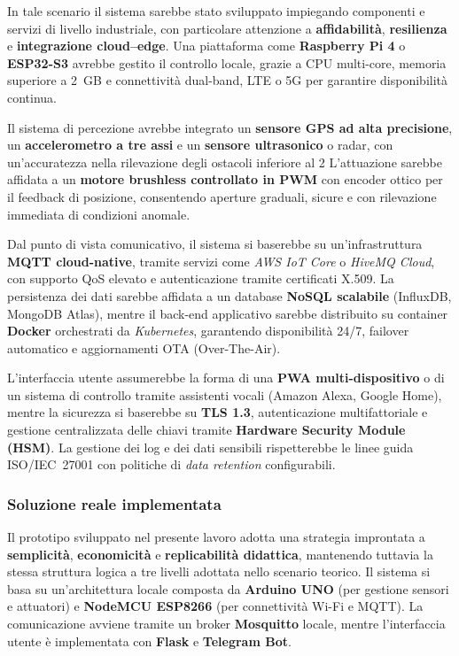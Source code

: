 In tale scenario il sistema sarebbe stato sviluppato impiegando componenti e servizi di livello industriale, con particolare attenzione a \textbf{affidabilità}, \textbf{resilienza} e \textbf{integrazione cloud–edge}.
Una piattaforma come \textbf{Raspberry Pi 4} o \textbf{ESP32-S3} avrebbe gestito il controllo locale, grazie a CPU multi-core, memoria superiore a 2~GB e connettività dual-band, LTE o 5G per garantire disponibilità continua.

Il sistema di percezione avrebbe integrato un \textbf{sensore GPS ad alta precisione}, un \textbf{accelerometro a tre assi} e un \textbf{sensore ultrasonico} o radar, con un’accuratezza nella rilevazione degli ostacoli inferiore al 2%
L’attuazione sarebbe affidata a un \textbf{motore brushless controllato in PWM} con encoder ottico per il feedback di posizione, consentendo aperture graduali, sicure e con rilevazione immediata di condizioni anomale.

Dal punto di vista comunicativo, il sistema si baserebbe su un’infrastruttura \textbf{MQTT cloud-native}, tramite servizi come \textit{AWS IoT Core} o \textit{HiveMQ Cloud}, con supporto QoS elevato e autenticazione tramite certificati X.509.
La persistenza dei dati sarebbe affidata a un database \textbf{NoSQL scalabile} (InfluxDB, MongoDB Atlas), mentre il back-end applicativo sarebbe distribuito su container \textbf{Docker} orchestrati da \textit{Kubernetes}, garantendo disponibilità 24/7, failover automatico e aggiornamenti OTA (Over-The-Air).

L’interfaccia utente assumerebbe la forma di una \textbf{PWA multi-dispositivo} o di un sistema di controllo tramite assistenti vocali (Amazon Alexa, Google Home), mentre la sicurezza si baserebbe su \textbf{TLS 1.3}, autenticazione multifattoriale e gestione centralizzata delle chiavi tramite \textbf{Hardware Security Module (HSM)}.
La gestione dei log e dei dati sensibili rispetterebbe le linee guida ISO/IEC~27001 con politiche di \textit{data retention} configurabili.

\subsubsection*{Soluzione reale implementata}

Il prototipo sviluppato nel presente lavoro adotta una strategia improntata a \textbf{semplicità}, \textbf{economicità} e \textbf{replicabilità didattica}, mantenendo tuttavia la stessa struttura logica a tre livelli adottata nello scenario teorico.
Il sistema si basa su un’architettura locale composta da \textbf{Arduino UNO} (per gestione sensori e attuatori) e \textbf{NodeMCU ESP8266} (per connettività Wi-Fi e MQTT).
La comunicazione avviene tramite un broker \textbf{Mosquitto} locale, mentre l’interfaccia utente è implementata con \textbf{Flask} e \textbf{Telegram Bot}.


